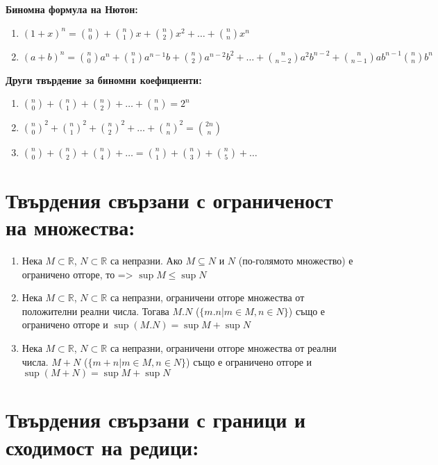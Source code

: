 \documentclass[11pt,oneside,a4paper]{article}
\begin{document}
\textbf{Биномна формула на Нютон: }\vspace{-\baselineskip}
\begin{enumerate}[label=\textbf{(\alph*)}]
    \item \((1 + x)^n = \binom{n}{0} + \binom{n}{1}x + \binom{n}{2}x^2 + \dots + \binom{n}{n}x^n\)
    \item \((a + b)^n = \binom{n}{0}a^n + \binom{n}{1}a^{n-1}b + \binom{n}{2}a^{n-2}b^2 + \dots + \binom{n}{n-2}a^2b^{n-2} + \binom{n}{n-1}ab^{n-1} \binom{n}{n}b^n \)
\end{enumerate}

\textbf{Други твърдение за биномни коефициенти: }\vspace{-\baselineskip}
\begin{enumerate}[label=\textbf{(\alph*)}]
    \item \(\binom{n}{0} + \binom{n}{1} + \binom{n}{2} + \dots + \binom{n}{n} = 2^n\)
    \item \(\binom{n}{0}^2 + \binom{n}{1}^2 + \binom{n}{2}^2 + \dots + \binom{n}{n}^2 = \binom{2n}{n}\)
    \item \(\binom{n}{0} + \binom{n}{2} + \binom{n}{4} + \dots = \binom{n}{1} + \binom{n}{3} + \binom{n}{5} + \dots \)
\end{enumerate}

\section*{Твърдения свързани с ограниченост на множества:}

\begin{enumerate}
    \item Нека \(M \subset \mathbb{R}\), \(N \subset \mathbb{R}\) са непразни. Ако \(M \subseteq N\) и \(N\) (по-голямото множество) е ограничено отгоре, то => \(\sup M \leq \sup N\)
    \item Нека \(M \subset \mathbb{R}\), \(N \subset \mathbb{R}\) са непразни, ограничени отгоре множества от положителни реални числа. Тогава \(M.N\) (\(\{m.n | m \in M, n \in N\}\)) също е ограничено отгоре и \(\sup (M.N) = \sup M + \sup N\)
    \item Нека \(M \subset \mathbb{R}\), \(N \subset \mathbb{R}\) са непразни, ограничени отгоре множества от реални числа. \(M + N\) (\(\{m + n | m \in M, n \in N\}\)) също е ограничено отгоре и \(\sup (M + N) = \sup M + \sup N\) 
\end{enumerate}

\section*{Твърдения свързани с граници и сходимост на редици:}
\end{document}
